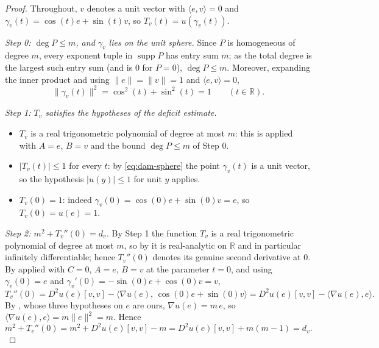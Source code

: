 \begin{proof}
Throughout, $v$ denotes a unit vector with $\langle e,v\rangle=0$ and
$\gamma_v(t)=\cos(t)e+\sin(t)v$, so $T_v(t)=u(\gamma_v(t))$.

\emph{Step 0: $\deg P\le m$, and $\gamma_v$ lies on the unit sphere.} Since $P$
is homogeneous of degree $m$, every exponent tuple in $\operatorname{supp}P$ has
entry sum $m$; as the total degree is the largest such entry sum (and is $0$ for
$P=0$), $\deg P\le m$. Moreover, expanding the inner product and using
$\lVert e\rVert=\lVert v\rVert=1$ and $\langle e,v\rangle=0$,
\begin{equation}\label{eq:dam-sphere}
  \lVert\gamma_v(t)\rVert^2=\cos^2(t)+\sin^2(t)=1
  \qquad(t\in\mathbb{R}).
\end{equation}

\emph{Step 1: $T_v$ satisfies the hypotheses of the deficit estimate.}
\begin{itemize}
\item $T_v$ is a real trigonometric polynomial of degree at most $m$: this is
   applied with $A=e$, $B=v$ and the bound
  $\deg P\le m$ of Step 0.
\item $\lvert T_v(t)\rvert\le1$ for every $t$: by \eqref{eq:dam-sphere} the
  point $\gamma_v(t)$ is a unit vector, so the hypothesis
  $\lvert u(y)\rvert\le1$ for unit $y$ applies.
\item $T_v(0)=1$: indeed $\gamma_v(0)=\cos(0)e+\sin(0)v=e$, so $T_v(0)=u(e)=1$.
\end{itemize}

\emph{Step 2: $m^2+T_v''(0)=d_v$.} By Step 1 the function $T_v$ is a real
trigonometric polynomial of degree at most $m$, so by  it
is real-analytic on $\mathbb{R}$ and in particular infinitely differentiable;
hence $T_v''(0)$ denotes its genuine second derivative at $0$. By
 applied
with $C=0$, $A=e$, $B=v$ at the parameter $t=0$, and using
$\gamma_v(0)=e$ and $\gamma_v'(0)=-\sin(0)e+\cos(0)v=v$,
\[
  T_v''(0)=D^2u(e)[v,v]-\bigl\langle\nabla u(e),\,\cos(0)e+\sin(0)v\bigr\rangle
         =D^2u(e)[v,v]-\bigl\langle\nabla u(e),e\bigr\rangle .
\]
By , whose three hypotheses on $e$ are ours,
$\nabla u(e)=m\,e$, so $\langle\nabla u(e),e\rangle=m\lVert e\rVert^2=m$. Hence
\begin{equation}\label{eq:dam-d}
  m^2+T_v''(0)=m^2+D^2u(e)[v,v]-m=D^2u(e)[v,v]+m(m-1)=d_v .
\end{equation}


\end{proof}

